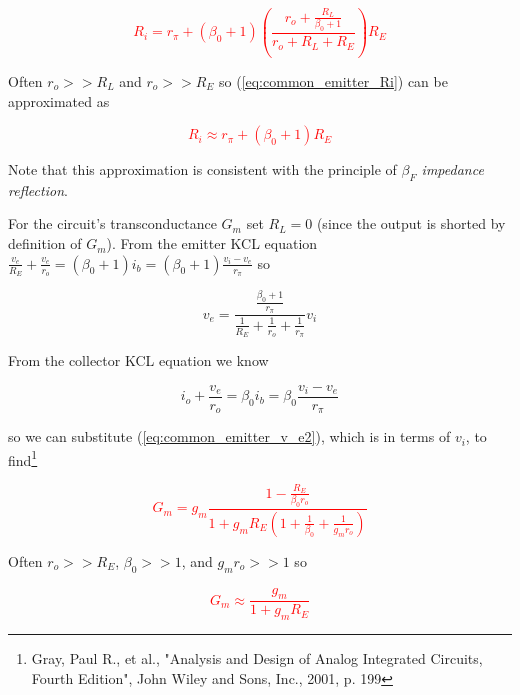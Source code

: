 \textcolor{red}{
\begin{equation}
R_{i} = r_{\pi} + (\beta_{0}+1)\left(\frac{r_{o} + \frac{R_{L}}{\beta_{0}+1}}{r_{o} + R_{L} + R_{E}}\right)R_{E}
\label{eq:common_emitter_Ri}
\end{equation}
}

\par
Often $r_{o} >> R_{L}$ and $r_{o} >> R_{E}$ so (\ref{eq:common_emitter_Ri}) can be approximated as

\textcolor{red}{
\begin{equation}
R_{i} \approx r_{\pi} + (\beta_{0}+1)R_{E}
\label{eq:common_emitter_Ri_approx}
\end{equation}
}

\noindent Note that this approximation is consistent with the principle of \textit{$\beta_{F}$ impedance reflection}.
\par
For the circuit's transconductance $G_{m}$ set $R_{L} = 0$ (since the output is shorted by definition of $G_{m}$). From the emitter KCL equation $\frac{v_{e}}{R_{E}} + \frac{v_{e}}{r_{o}} = (\beta_{0} + 1)i_{b} = (\beta_{0} + 1)\frac{v_{i}-v_{e}}{r_{\pi}}$ so

\begin{equation}
v_{e} = \frac{\frac{\beta_{0}+1}{r_{\pi}}}{\frac{1}{R_{E}} + \frac{1}{r_{o}} + \frac{1}{r_{\pi}}}v_{i}
\label{eq:common_emitter_v_e2}
\end{equation}

\noindent From the collector KCL equation we know

\begin{equation}
i_{o} + \frac{v_{e}}{r_{o}} = \beta_{0}i_{b} = \beta_{0}\frac{v_{i}-v_{e}}{r_{\pi}}
\label{eq:common_emitter_KCL_collector2}
\end{equation}

\noindent so we can substitute (\ref{eq:common_emitter_v_e2}), which is in terms of $v_{i}$, to find\footnote{Gray, Paul R., et al., "Analysis and Design of Analog Integrated Circuits, Fourth Edition", John Wiley and Sons, Inc., 2001, p. 199}

\textcolor{red}{
\begin{equation}
G_{m} = g_{m}\frac{1-\frac{R_{E}}{\beta_{0}r_{o}}}{1 + g_{m}R_{E}\left(1 + \frac{1}{\beta_{0}} + \frac{1}{g_{m}r_{o}}\right)}
\label{eq:common_emitter_Gm}
\end{equation}
}

\noindent Often $r_{o} >> R_{E}$, $\beta_{0} >> 1$, and $g_{m}r_{o} >> 1$ so

\textcolor{red}{
\begin{equation}
G_{m} \approx \frac{g_{m}}{1 + g_{m}R_{E}}
\label{eq:common_emitter_Gm_approx}
\end{equation}
}

